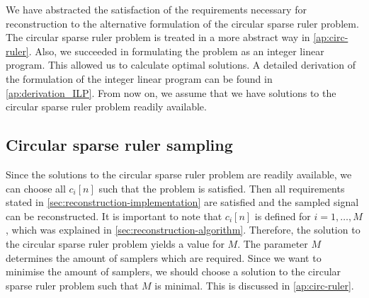 \documentclass[a4paper, openany, oneside]{memoir}
\begin{document}
We have abstracted the satisfaction of the requirements necessary for reconstruction to the alternative formulation of the circular sparse ruler problem. The circular sparse ruler problem is treated in a more abstract way in \cref{ap:circ-ruler}. Also, we succeeded in formulating the problem as an integer linear program. This allowed us to calculate optimal solutions. A detailed derivation of the formulation of the integer linear program can be found in \cref{ap:derivation_ILP}. From now on, we assume that we have solutions to the circular sparse ruler problem readily available.

\subsection{Circular sparse ruler sampling}\label{sub:ci-circ}
Since the solutions to the circular sparse ruler problem are readily available, we can choose all $c_i[n]$ such that the problem is satisfied. Then all requirements stated in \cref{sec:reconstruction-implementation} are satisfied and the sampled signal can be reconstructed. It is important to note that $c_i[n]$ is defined for $i = 1,\ldots,M$, which was explained in \cref{sec:reconstruction-algorithm}. Therefore, the solution to the circular sparse ruler problem yields a value for $M$. The parameter $M$ determines the amount of samplers which are required. Since we want to minimise the amount of samplers, we should choose a solution to the circular sparse ruler problem such that $M$ is minimal. This is discussed in \cref{ap:circ-ruler}.
\end{document}
